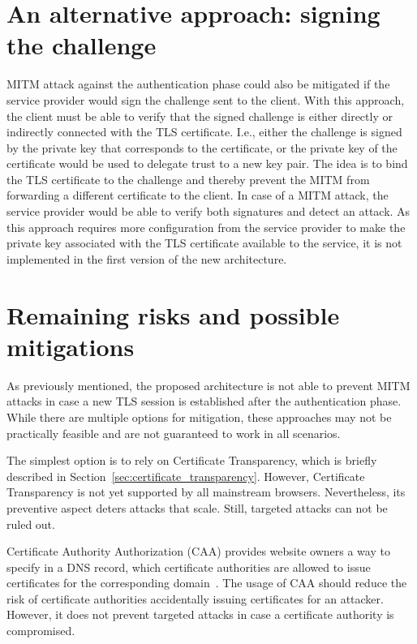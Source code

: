 \section{An alternative approach: signing the challenge}
\label{sec:challenge_signing}
MITM attack against the authentication phase could also be mitigated if the service provider would sign the challenge sent to the client. With this approach, the client must be able to verify that the signed challenge is either directly or indirectly connected with the TLS certificate. I.e., either the challenge is signed by the private key that corresponds to the certificate, or the private key of the certificate would be used to delegate trust to a new key pair. The idea is to bind the TLS certificate to the challenge and thereby prevent the MITM from forwarding a different certificate to the client. In case of a MITM attack, the service provider would be able to verify both signatures and detect an attack. As this approach requires more configuration from the service provider to make the private key associated with the TLS certificate available to the service, it is not implemented in the first version of the new architecture.


\section{Remaining risks and possible mitigations}
\label{sec:mitm_risks_mitigations}
As previously mentioned, the proposed architecture is not able to prevent MITM attacks in case a new TLS session is established after the authentication phase. While there are multiple options for mitigation, these approaches may not be practically feasible and are not guaranteed to work in all scenarios.

The simplest option is to rely on Certificate Transparency, which is briefly described in Section~\ref{sec:certificate_transparency}. However, Certificate Transparency is not yet supported by all mainstream browsers. Nevertheless, its preventive aspect deters attacks that scale. Still, targeted attacks can not be ruled out.

Certificate Authority Authorization (CAA) provides website owners a way to specify in a DNS record, which certificate authorities are allowed to issue certificates for the corresponding domain~\cite{rfc8659}. The usage of CAA should reduce the risk of certificate authorities accidentally issuing certificates for an attacker. However, it does not prevent targeted attacks in case a certificate authority is compromised.

